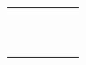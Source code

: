 \begin{tabularx}{0.99\textwidth}{c||X|X|X|X}
          &               &                             &             &                    \\
  \hline 
          &               &                             &             &                    \\
  \hline 
          &               &                             &             &                    \\
  \hline 
          &               &                             &             &                    \\
  \hline 
          &               &                             &             &                    \\
  \hline 
          &               &                             &             &                    \\
  \hline 
          &               &                             &             &                    \\
  \hline 
          &               &                             &             &                    \\
  \hline 
          &               &                             &             &                    \\
  \hline 
          &               &                             &             &                    \\
  \bottomrule
\end{tabularx}
